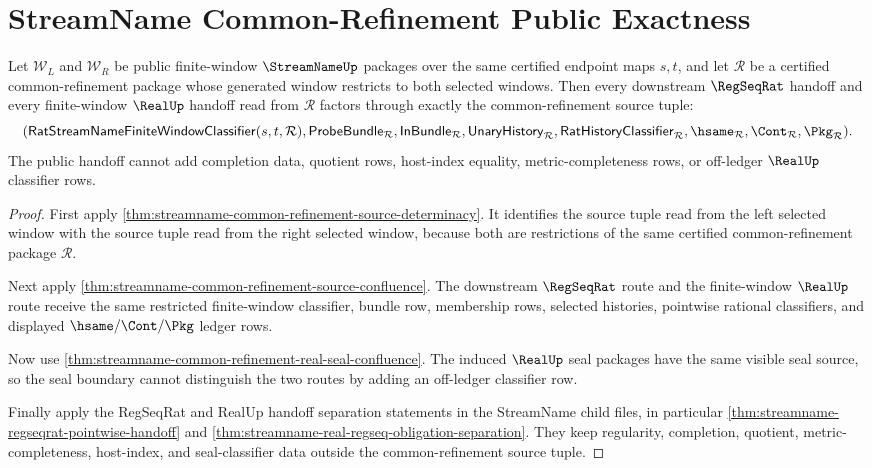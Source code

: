 \section{StreamName Common-Refinement Public Exactness}
\label{sec:streamname-common-refinement-public-exactness}

\begin{theorem}
\label{thm:streamname-common-refinement-public-exactness}
Let $\mathcal W_L$ and $\mathcal W_R$ be public finite-window $\StreamNameUp$ packages over the same certified endpoint maps $s,t$, and let $\mathcal R$ be a certified common-refinement package whose generated window restricts to both selected windows. Then every downstream $\RegSeqRat$ handoff and every finite-window $\RealUp$ handoff read from $\mathcal R$ factors through exactly the common-refinement source tuple:
$$
(\mathsf{RatStreamNameFiniteWindowClassifier}(s,t,\mathcal R),
\mathsf{ProbeBundle}_{\mathcal R},
\mathsf{InBundle}_{\mathcal R},
\mathsf{UnaryHistory}_{\mathcal R},
\mathsf{RatHistoryClassifier}_{\mathcal R},
\hsame_{\mathcal R},
\Cont_{\mathcal R},
\Pkg_{\mathcal R}).
$$
The public handoff cannot add completion data, quotient rows, host-index equality, metric-completeness rows, or off-ledger $\RealUp$ classifier rows.
\end{theorem}
\begin{proof}
First apply \autoref{thm:streamname-common-refinement-source-determinacy}. It identifies the source tuple read from the left selected window with the source tuple read from the right selected window, because both are restrictions of the same certified common-refinement package $\mathcal R$.

Next apply \autoref{thm:streamname-common-refinement-source-confluence}. The downstream $\RegSeqRat$ route and the finite-window $\RealUp$ route receive the same restricted finite-window classifier, bundle row, membership rows, selected histories, pointwise rational classifiers, and displayed $\hsame/\Cont/\Pkg$ ledger rows.

Now use \autoref{thm:streamname-common-refinement-real-seal-confluence}. The induced $\RealUp$ seal packages have the same visible seal source, so the seal boundary cannot distinguish the two routes by adding an off-ledger classifier row.

Finally apply the RegSeqRat and RealUp handoff separation statements in the StreamName child files, in particular \autoref{thm:streamname-regseqrat-pointwise-handoff} and \autoref{thm:streamname-real-regseq-obligation-separation}. They keep regularity, completion, quotient, metric-completeness, host-index, and seal-classifier data outside the common-refinement source tuple.
\end{proof}

